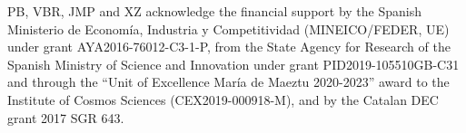 \documentclass[letter]{aa}
\begin{document}
\begin{acknowledgements}
PB, VBR, JMP and XZ acknowledge the financial support by the Spanish Ministerio de Econom\'{i}a, Industria y Competitividad (MINEICO/FEDER, UE) under grant AYA2016-76012-C3-1-P, from the State Agency for Research of the Spanish Ministry of Science and Innovation under grant PID2019-105510GB-C31 and through the “Unit of Excellence Mar\'{i}a de Maeztu 2020-2023” award to the Institute of Cosmos Sciences (CEX2019-000918-M), and by the Catalan DEC grant 2017 SGR 643.  
\end{acknowledgements}


 
 
\end{document}
